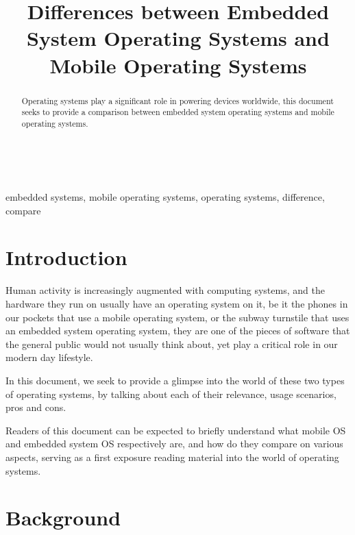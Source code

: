 \documentclass[conference]{IEEEtran}
\newcommand{\forceindent}{\leavevmode{\parindent=1em\indent}}
\begin{document}
\title{Differences between Embedded System Operating Systems and Mobile Operating Systems\\
}



\maketitle

\forceindent \begin{abstract}
Operating systems play a significant role in powering devices worldwide, this document seeks to provide a comparison between embedded system operating systems and mobile operating systems.
\end{abstract}
\mbox{} \\
\forceindent \begin{IEEEkeywords}
embedded systems, mobile operating systems, operating systems, difference, compare
\end{IEEEkeywords}

\section{Introduction}
\forceindent Human activity is increasingly augmented with computing systems, and the hardware they run on usually have an operating system on it, be it the phones in our pockets that use a mobile operating system, or the subway turnstile that uses an embedded system operating system, they are one of the pieces of software that the general public would not usually think about, yet play a critical role in our modern day lifestyle.

\smallskip
\forceindent In this document, we seek to provide a glimpse into the world of these two types of operating systems, by talking about each of their relevance, usage scenarios, pros and cons.

\smallskip
\forceindent Readers of this document can be expected to briefly understand what mobile OS and embedded system OS respectively are, and how do they compare on various aspects, serving as a first exposure reading material into the world of operating systems.


\section{Background}
\end{document}
